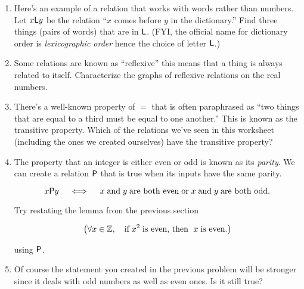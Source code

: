 \documentclass{amsart}
\begin{document}
\begin{enumerate}
\vfill

\item Here's an example of a relation that works with words rather than numbers.  Let  
$x\mbox{\textsf L}y$ be the relation ``$x$ comes before $y$ in the dictionary.''  Find three things (pairs of words) that are in $\mbox{\textsf L}$.  (FYI, the official name for dictionary order is {\em lexicographic order} hence the choice of letter $\mbox{\textsf L}$.)

\vfill

\newpage

\item Some relations are known as ``reflexive'' this means that a thing is always related to itself.  Characterize the graphs of reflexive relations on the real numbers.

\vfill

\item There's a well-known property of $=$ that is often paraphrased as ``two things that are equal to a third must be equal to one another.''  This is known as the transitive property.  Which of the relations we've seen in this worksheet (including the ones we created ourselves) have the transitive property?

\vfill

\item The property that an integer is either even or odd is known as its {\em parity}.  We can create a relation $\mbox{\textsf P}$ that is true when its inputs have the same parity.

\[ x \mbox{\textsf P} y \quad \iff \quad x \; \mbox{and} \; y \; \mbox{are both even} \; \mbox{or} \; x \; \mbox{and} \; y \; \mbox{are both odd}. \] 

Try restating the lemma from the previous section 

\[  \left( \forall x \in {\mathbb Z}, \quad \mbox{if} \; x^2 \; \mbox{is even, then } \; x \; \mbox{is even}. \right) \]

\noindent using $\mbox{\textsf P}$.  

\vfill

\item Of course the statement you created in the previous problem will be stronger since it deals with odd numbers as well as even ones.  Is it still true?

\vfill

\end{enumerate}
\end{document}
